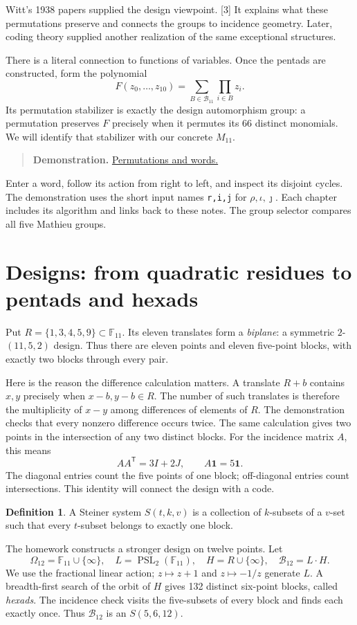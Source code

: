 \documentclass[12pt,letterpaper]{article}
\theoremstyle{definition}
\newtheorem{definition}[theorem]{Definition}
\theoremstyle{remark}
\newenvironment{toolnote}{\begin{quote}\small\color{navy}}{\end{quote}}
\newcommand{\F}{\mathbb F}\newcommand{\Z}{\mathbb Z}
\DeclareMathOperator{\PSL}{PSL}\DeclareMathOperator{\Isom}{Isom}
\newcommand{\pageheading}[1]{\clearpage\section{#1}}
\newcommand{\demolink}[2]{\href{https://gtevelev-max.github.io/mathieu/\##1}{#2}}
\newcommand{\demobox}[2]{\begin{toolnote}\textbf{Demonstration.} \demolink{#1}{#2}\end{toolnote}}
\begin{document}
Witt's 1938 papers supplied the design viewpoint. [3] It explains what these permutations preserve and connects the groups to incidence geometry. Later, coding theory supplied another realization of the same exceptional structures.

There is a literal connection to functions of variables. Once the pentads are constructed, form the polynomial
\[
 F(z_0,\ldots,z_{10})=\sum_{B\in\mathcal B_{11}}\prod_{i\in B}z_i.
\]
Its permutation stabilizer is exactly the design automorphism group: a permutation preserves $F$ precisely when it permutes its 66 distinct monomials. We will identify that stabilizer with our concrete $M_{11}$.


\demobox{permutations?group=11}{Permutations and words.} Enter a word, follow its action from right to left, and inspect its disjoint cycles. The demonstration uses the short input names \texttt{r,i,j} for $\rho,\iota,\jmath$. Each chapter includes its algorithm and links back to these notes. The group selector compares all five Mathieu groups.

\hypertarget{designs}{}
\pageheading{Designs: from quadratic residues to pentads and hexads}
Put $R=\{1,3,4,5,9\}\subset\F_{11}$. Its eleven translates form a \emph{biplane}: a symmetric $2$-$(11,5,2)$ design. Thus there are eleven points and eleven five-point blocks, with exactly two blocks through every pair.

Here is the reason the difference calculation matters. A translate $R+b$ contains $x,y$ precisely when $x-b,y-b\in R$. The number of such translates is therefore the multiplicity of $x-y$ among differences of elements of $R$. The demonstration checks that every nonzero difference occurs twice. The same calculation gives two points in the intersection of any two distinct blocks. For the incidence matrix $A$, this means
\[
 AA^{\mathsf T}=3I+2J,\qquad A\mathbf1=5\mathbf1.
\]
The diagonal entries count the five points of one block; off-diagonal entries count intersections. This identity will connect the design with a code.

\begin{definition}
A Steiner system $S(t,k,v)$ is a collection of $k$-subsets of a $v$-set such that every $t$-subset belongs to exactly one block.
\end{definition}
The homework constructs a stronger design on twelve points. Let
\[
 \Omega_{12}=\F_{11}\cup\{\infty\},\quad
 L=\PSL_2(\F_{11}),\quad H=R\cup\{\infty\},\quad
 \mathcal B_{12}=L\cdot H.
\]
We use the fractional linear action; $z\mapsto z+1$ and $z\mapsto-1/z$ generate $L$. A breadth-first search of the orbit of $H$ gives 132 distinct six-point blocks, called \emph{hexads}. The incidence check visits the five-subsets of every block and finds each exactly once. Thus $\mathcal B_{12}$ is an $S(5,6,12)$.
\end{document}
